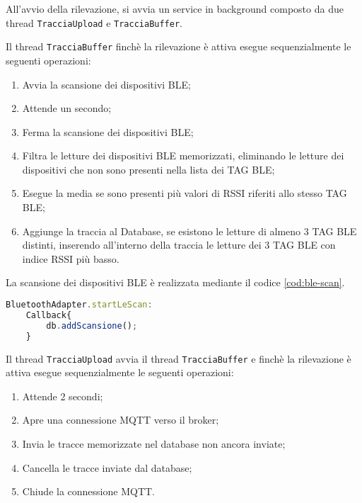 All'avvio della rilevazione, si avvia un service in background composto da due thread \texttt{TracciaUpload} e \texttt{TracciaBuffer}.

Il thread \texttt{TracciaBuffer} finchè la rilevazione è attiva esegue sequenzialmente le seguenti operazioni:
\begin{enumerate}
	
	\item Avvia la scansione dei dispositivi BLE;
	
	\item Attende un secondo;
	
	\item Ferma la scansione dei dispositivi BLE;
	
	\item Filtra le letture dei dispositivi BLE memorizzati, eliminando le letture dei dispositivi che non sono presenti nella lista dei TAG BLE;
	
	\item Esegue la media se sono presenti più valori di RSSI riferiti allo stesso TAG BLE;
	
	\item Aggiunge la traccia al Database, se esistono le letture di almeno 3 TAG BLE distinti, inserendo all'interno della traccia le letture dei 3 TAG BLE con indice RSSI più basso.
	 
\end{enumerate}
La scansione dei dispositivi BLE è realizzata mediante il codice \ref{cod:ble-scan}.

\begin{lstlisting}[language=JavaScript, label=cod:ble-scan, caption=Scansione dei dispositivi BLE]
BluetoothAdapter.startLeScan:
	Callback{
		db.addScansione();
	}
\end{lstlisting}

Il thread \texttt{TracciaUpload} avvia il thread \texttt{TracciaBuffer} e finchè la rilevazione è attiva esegue sequenzialmente le seguenti operazioni:
\begin{enumerate}
	
	\item Attende 2 secondi;
	
	\item Apre una connessione MQTT verso il broker;
	
	\item Invia le tracce memorizzate nel database non ancora inviate;
	
	\item Cancella le tracce inviate dal database;
	
	\item Chiude la connessione MQTT.
	 
\end{enumerate}